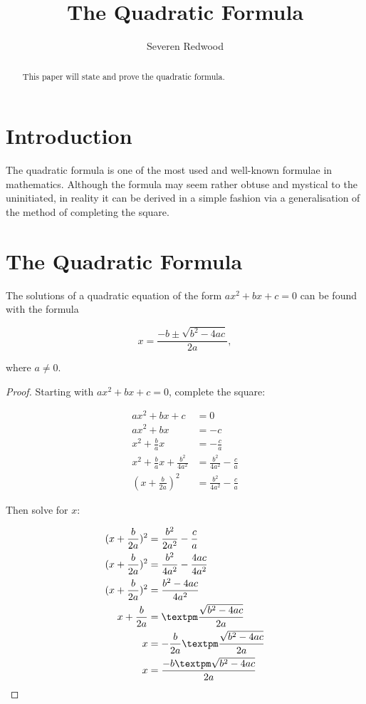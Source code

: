 \documentclass[parskip]{scrartcl}
\title{The Quadratic Formula}
\author{Severen Redwood}
\begin{document}
\maketitle

\begin{abstract}
This paper will state and prove the quadratic formula.
\end{abstract}

\section{Introduction}

The quadratic formula is one of the most used and well-known formulae in
mathematics. Although the formula may seem rather obtuse and mystical to the
uninitiated, in reality it can be derived in a simple fashion via a
generalisation of the method of completing the square.

\section{The Quadratic Formula}

\begin{theorem}
The solutions of a quadratic equation of the form \(ax^2 + bx + c = 0\) can be
found with the formula

\[ x = \frac{-b ±\sqrt{b^2 - 4ac}}{2a}, \]

where \(a ≠ 0\).
\end{theorem}

\pagebreak

\begin{proof}
Starting with \(ax^2 + bx + c = 0\), complete the square:

\begin{align*}
    ax^2 + bx + c &= 0 \\
    ax^2 + bx &= -c \\
    x^2 + \frac{b}{a}x &= -\frac{c}{a} \\
    x^2 + \frac{b}{a}x + \frac{b^2}{4a^2} &= \frac{b^2}{4a^2} - \frac{c}{a} \\
    (x + \frac{b}{2a})^2 &= \frac{b^2}{4a^2} - \frac{c}{a}
\end{align*}

Then solve for \(x\):

\begin{align*}
    (x + \frac{b}{2a})^2 &= \frac{b^2}{2a^2} - \frac{c}{a} \\
    (x + \frac{b}{2a})^2 &= \frac{b^2}{4a^2} - \frac{4ac}{4a^2} \\
    (x + \frac{b}{2a})^2 &= \frac{b^2 - 4ac}{4a^2} \\
    x + \frac{b}{2a} &= ±\frac{\sqrt{b^2 - 4ac}}{2a} \\
    x &= -\frac{b}{2a} ±\frac{\sqrt{b^2 - 4ac}}{2a} \\
    x &= \frac{-b ± \sqrt{b^2 - 4ac}}{2a} \qedhere
\end{align*}
\end{proof}
\end{document}
